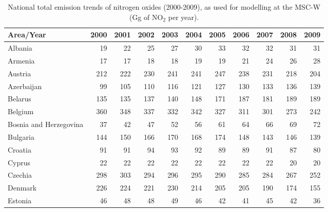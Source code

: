  \begin{table}
 \caption{National total emission trends of  nitrogen oxides (2000-2009), as used for modelling at the MSC-W (Gg of NO$_2$ per year).}
 
 \vspace{15pt}
 
 \scriptsize
 \centering
 \begin{tabular}{|l|r|r|r|r|r|r|r|r|r|r|}
 \hline
                     Area/Year&   2000&   2001&   2002&   2003&   2004&   2005&   2006&   2007&   2008&   2009\\\hline\hline
                       Albania&     19&     22&     25&     27&     30&     33&     32&     32&     31&     31\\\hline
                       Armenia&     17&     17&     18&     18&     19&     19&     21&     24&     26&     28\\\hline
                       Austria&    212&    222&    230&    241&    241&    247&    238&    231&    218&    204\\\hline
                    Azerbaijan&     99&    105&    110&    116&    121&    127&    130&    133&    136&    139\\\hline
                       Belarus&    135&    135&    137&    140&    148&    171&    187&    181&    189&    189\\\hline
                       Belgium&    360&    348&    337&    332&    342&    327&    311&    301&    273&    242\\\hline
        Bosnia and Herzegovina&     37&     42&     47&     52&     56&     61&     64&     66&     69&     72\\\hline
                      Bulgaria&    144&    150&    166&    170&    168&    174&    148&    143&    146&    139\\\hline
                       Croatia&     91&     91&     94&     93&     92&     89&     89&     91&     87&     80\\\hline
                        Cyprus&     22&     22&     22&     22&     22&     22&     22&     22&     20&     20\\\hline
                       Czechia&    298&    303&    294&    296&    295&    290&    285&    284&    267&    252\\\hline
                       Denmark&    226&    224&    221&    230&    214&    205&    205&    190&    174&    155\\\hline
                       Estonia&     46&     48&     48&     49&     46&     42&     41&     45&     42&     36\\\hline

\end{tabular}
\end{table}
